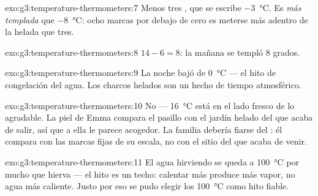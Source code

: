\begin{solution}{exo:g3:temperature-thermometers:7}
Menos tres , que se escribe \qty{-3}{\celsius}. Es
\emph{más templada} que \qty{-8}{\celsius}: ocho marcas por debajo de
cero es meterse más adentro de la helada que tres.
\end{solution}

\begin{solution}{exo:g3:temperature-thermometers:8}
$14 - 6 = 8$: la mañana se templó $8$ grados.
\end{solution}

\begin{solution}{exo:g3:temperature-thermometers:9}
La noche bajó de \qty{0}{\celsius} --- el hito de congelación del
agua. Los charcos helados son un  hecho de tiempo
atmosférico.
\end{solution}

\begin{solution}{exo:g3:temperature-thermometers:10}
No --- \qty{16}{\celsius} está en el lado fresco de lo agradable. La
piel de Emma compara el pasillo con el jardín helado del que acaba de
salir, así que a ella le parece acogedor. La familia debería fiarse
del : él compara con las marcas fijas de su escala, no
con el sitio del que acaba de venir.
\end{solution}

\begin{solution}{exo:g3:temperature-thermometers:11}
El agua hirviendo se queda a \qty{100}{\celsius} por mucho que hierva
--- el hito es un techo: calentar más produce más vapor, no agua más
caliente. Justo por eso se pudo elegir los \qty{100}{\celsius} como
hito fiable.
\end{solution}
